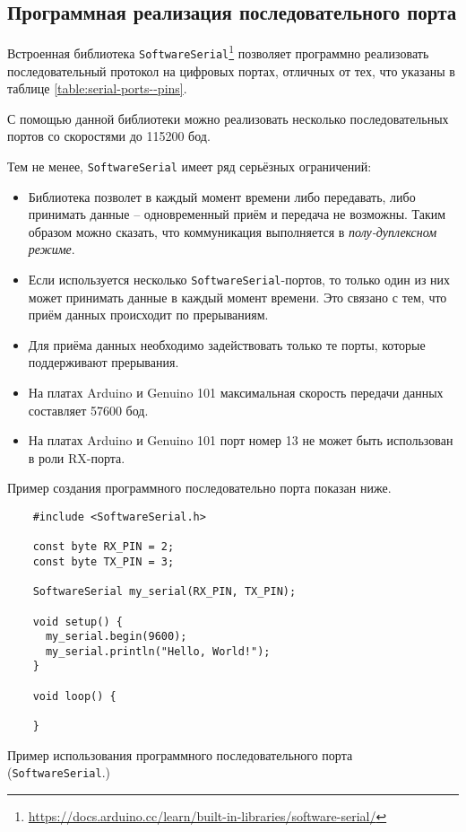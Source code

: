 \documentclass[../sparc.tex]{subfiles}
\begin{document}
\subsection{Программная реализация последовательного порта}

Встроенная библиотека
\texttt{SoftwareSerial}\footnote{\url{https://docs.arduino.cc/learn/built-in-libraries/software-serial/}}
позволяет программно реализовать последовательный протокол на цифровых портах,
отличных от тех, что указаны в таблице \ref{table:serial-ports--pins}.

С помощью данной библиотеки можно реализовать несколько последовательных портов
со скоростями до 115200 бод.

Тем не менее, \texttt{SoftwareSerial} имеет ряд серьёзных ограничений:
\begin{itemize}
\item Библиотека позволет в каждый момент времени либо передавать, либо
  принимать данные -- одновременный приём и передача не возможны. Таким образом
  можно сказать, что коммуникация выполняется в \emph{полу-дуплексном режиме}.
\item Если используется несколько \texttt{SoftwareSerial}-портов, то только один
  из них может принимать данные в каждый момент времени.  Это связано с тем, что
  приём данных происходит по прерываниям.
\item Для приёма данных необходимо задействовать только те порты, которые
  поддерживают прерывания.
\item На платах Arduino и Genuino 101 максимальная скорость передачи данных
  составляет 57600 бод.
\item На платах Arduino и Genuino 101 порт номер 13 не может быть использован в
  роли RX-порта.
\end{itemize}

Пример создания программного последовательно порта показан ниже.

\begin{listing}[H]
  \begin{verbatim}
    #include <SoftwareSerial.h>

    const byte RX_PIN = 2;
    const byte TX_PIN = 3;

    SoftwareSerial my_serial(RX_PIN, TX_PIN);

    void setup() {
      my_serial.begin(9600);
      my_serial.println("Hello, World!");
    }

    void loop() {

    }
  \end{verbatim}
  \label{listing:communication-serial-software}
  \caption{Пример использования программного последовательного порта
    (\texttt{SoftwareSerial}.)}
\end{listing}
\end{document}

